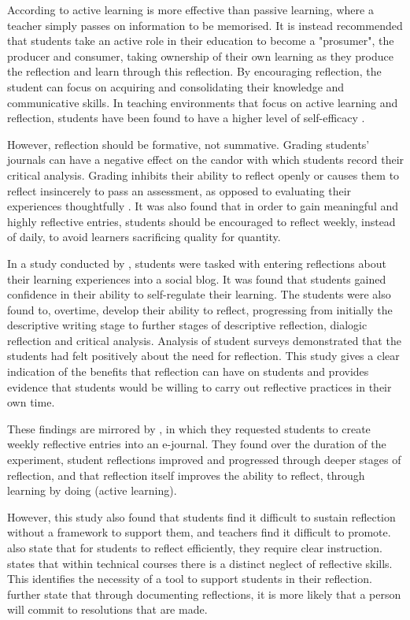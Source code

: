 \documentclass{l4proj}
\begin{document}
According to \citet{bruno_reflective_2018} active learning is more effective than passive learning, where a teacher simply passes on information to be memorised. It is instead recommended that students take an active role in their education to become a "prosumer", the producer and consumer, taking ownership of their own learning as they produce the reflection and learn through this reflection. By encouraging reflection, the student can focus on acquiring and consolidating their knowledge and communicative skills. In teaching environments that focus on active learning and reflection, students have been found to have a higher level of self-efficacy \citep{bruno_reflective_2018}.

However, reflection should be formative, not summative. Grading students’ journals can have a negative effect on the candor with which students record their critical analysis. Grading inhibits their ability to reflect openly or causes them to reflect insincerely to pass an assessment, as opposed to evaluating their experiences thoughtfully \citep{bruno_reflective_2018}. It was also found that in order to gain meaningful and highly reflective entries, students should be encouraged to reflect weekly, instead of daily, to avoid learners sacrificing quality for quantity.

In a study conducted by \citet{mcdermott_developing_nodate}, students were tasked with entering reflections about their learning experiences into a social blog. It was found that students gained confidence in their ability to self-regulate their learning. The students were also found to, overtime, develop their ability to reflect, progressing from initially the descriptive writing stage to further stages of descriptive reflection, dialogic reflection and critical analysis. Analysis of student surveys demonstrated that the students had felt positively about the need for reflection. This study gives a clear indication of the benefits that reflection can have on students and provides evidence that students would be willing to carry out reflective practices in their own time.

These findings are mirrored by \citet{bruno_reflective_2018}, in which they requested students to create weekly reflective entries into an e-journal. They found over the duration of the experiment, student reflections improved and progressed through deeper stages of reflection, and that reflection itself improves the ability to reflect, through learning by doing (active learning). 

However, this study also found that students find it difficult to sustain reflection without a framework to support them, and teachers find it difficult to promote. \citet{bruno_reflective_2018} also state that for students to reflect efficiently, they require clear instruction. \citet{thurner_development_2020} states that within technical courses there is a distinct neglect of reflective skills. This identifies the necessity of a tool to support students in their reflection. \citet{thurner_development_2020} further state that through documenting reflections, it is more likely that a person will commit to resolutions that are made.
\end{document}
